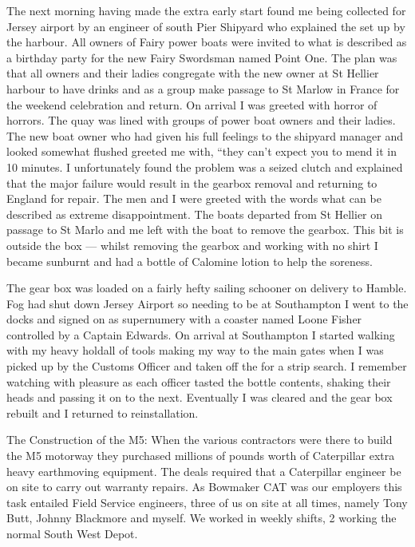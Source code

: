 The next morning having made the extra early start found me being collected for
Jersey airport by an engineer of south Pier Shipyard who explained the set up
by the harbour.  All owners of Fairy power boats were invited to what is
described as a birthday party for the new Fairy Swordsman named Point One.  The
plan was that all owners and their ladies congregate with the new owner at St
Hellier harbour to have drinks and as a group make passage to St Marlow in
France for the weekend celebration and return.  On arrival I was greeted with
horror of horrors.  The quay was lined with groups of power boat owners and
their ladies.  The new boat owner who had given his full feelings to the
shipyard manager and looked somewhat flushed greeted me with, ``they can't
expect you to mend it in 10 minutes.  I unfortunately found the problem was a
seized clutch and explained that the major failure would result in the gearbox
removal and returning to England for repair.  The men and I were greeted with
the words what can be described as extreme disappointment.  The boats departed
from St Hellier on passage to St Marlo and me left with the boat to remove the
gearbox.  This bit is outside the box --- whilst removing the gearbox and working
with no shirt I became sunburnt and had a bottle of Calomine lotion to help the
soreness.

The gear box was loaded on a fairly hefty sailing schooner on delivery to
Hamble.  Fog had shut down Jersey Airport so needing to be at Southampton I
went to the docks and signed on as supernumery with a coaster named Loone
Fisher controlled by a Captain Edwards.  On arrival at Southampton I started
walking with my heavy holdall of tools making my way to the main gates when I
was picked up by the Customs Officer and taken off  the for a strip search.  I
remember watching with pleasure as each officer tasted the bottle contents,
shaking their heads and passing it on to the next.  Eventually I was cleared
and the gear box rebuilt and I returned to reinstallation.

The Construction of the M5:  When the various contractors were there to build
the M5 motorway  they purchased millions of pounds worth of Caterpillar extra
heavy earthmoving equipment.  The deals required that a Caterpillar engineer be
on site to carry out warranty repairs.  As Bowmaker  CAT was our employers this
task entailed Field Service engineers, three of us on site at all times, namely
Tony Butt, Johnny Blackmore and myself.  We worked in weekly shifts, 2 working
the normal South West Depot.

